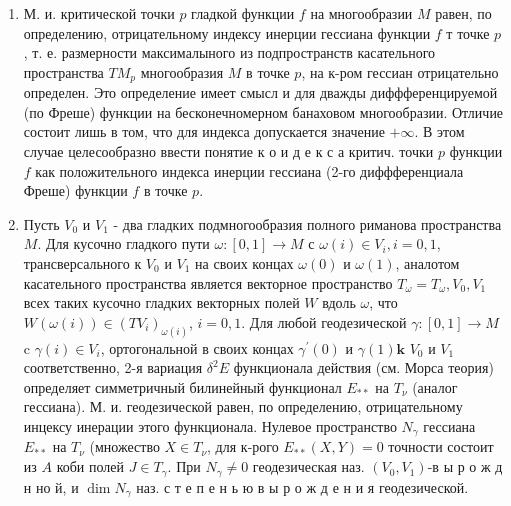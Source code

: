 \documentclass[10pt]{article}
\begin{document}
\begin{enumerate}

  \item М. и. критической точки $p$ гладкой функции $f$ на многообразии $M$ равен, по определению, отрицательному индексу инерции гессиана функции $f$ т точке $p$, т. е. размерности максималыного из подпространств касательного пространства $T M_{p}$ многообразия $M$ в точке $p$, на к-ром гессиан отрицательно определен. Это определение имеет смысл и для дважды диффференцируемой (по Фреше) функции на бесконечномерном банаховом многообразии. Отличие состоит лишь в том, что для индекса допускается значение $+\infty$. В этом случае целесообразно ввести понятие к о и д е к с а критич. точки $p$ функции $f$ как положительного индекса инерции гессиана (2-го диффференциала Фреше) функции $f$ в точке $p$.



  \item Пусть $V_{0}$ и $V_{1}$ - два гладких подмногообразия полного риманова пространства $M$. Для кусочно гладкого пути $\omega:[0,1] \rightarrow M$ с $\omega(i) \in V_{i}, i=0,1$, трансверсального к $V_{0}$ и $V_{1}$ на своих концах $\omega(0)$ и $\omega(1)$, аналотом касательного пространства является векторное пространство $T_{\omega}=T_{\omega}, V_{0}, V_{1}$ всех таких кусочно гладких векторных полей $W$ вдоль $\omega$, что $W(\omega(i)) \in\left(T V_{i}\right)_{\omega(i)}$, $i=0,1$. Для любой геодезической $\gamma:[0,1] \rightarrow M$ c $\gamma(i) \in V_{i}$, ортогональной в своих концах $\gamma^{\prime}(0)$ и $\gamma(1) \mathbf{k}$ $V_{0}$ и $V_{1}$ соответственно, 2-я вариация $\delta^{2} E$ функционала действия (см. Морса теория) определяет симметричный билинейный функционал $E_{* *}$ на $T_{\nu}$ (аналог гессиана). М. и. геодезической равен, по определению, отрицательному инцексу инерации этого функционала. Нулевое пространство $N_{\gamma}$ гессиана $E_{* *}$ на $T_{\nu}$ (множество $X \in T_{\nu}$, для к-рого $E_{* *}(X, Y)=0$ точности состоит из $A$ коби полей $J \in T_{\gamma}$. При $N_{\gamma} \neq 0$ геодезическая наз. $\left(V_{0}, V_{1}\right)$-в ы р о ж д н но й, и $\operatorname{dim} N_{\gamma}$ наз. с т е п е н ь ю в ы р о ж д е н и я геодезической.



\end{enumerate}
\end{document}
